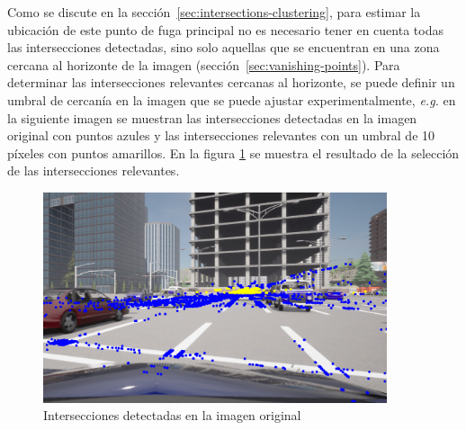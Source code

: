 Como se discute en la sección~\ref{sec:intersections-clustering}, para estimar la ubicación de este punto de fuga principal no es necesario tener en cuenta todas las intersecciones detectadas, sino solo aquellas que se encuentran en una zona cercana al horizonte de la imagen (sección~\ref{sec:vanishing-points}).
Para determinar las intersecciones relevantes cercanas al horizonte, se puede definir un umbral de cercanía en la imagen que se puede ajustar experimentalmente, \emph{e.g.} en la siguiente imagen se muestran las intersecciones detectadas en la imagen original con puntos azules
y las intersecciones relevantes con un umbral de 10 píxeles con puntos amarillos.
En la figura \ref{fig:relevantInter} se muestra el resultado de la selección de las intersecciones relevantes. \\
\begin{figure}[!ht]
    \centering
    \includegraphics[width=0.9\textwidth]{img/reticule/relevantInter}
    \caption{Intersecciones detectadas en la imagen original}
    \label{fig:relevantInter}
\end{figure}


